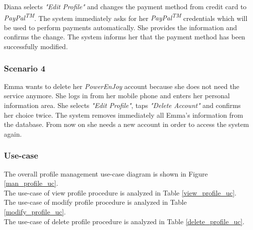 Diana selects \emph{"Edit Profile"} and changes the payment method from credit card to \emph{PayPal\textsuperscript{TM}}. The system immediately asks for her \emph{PayPal\textsuperscript{TM}} credentials which will be used to perform payments automatically. She provides the information and confirms the change. The system informs her that the payment method has been successfully modified.

\subsubsection{Scenario 4}
Emma wants to delete her \emph{PowerEnJoy} account because she does not need the service anymore. She logs in from her mobile phone and enters her personal information area. She selects \emph{"Edit Profile"}, taps \emph{"Delete Account"} and confirms her choice twice. The system removes immediately all Emma's information from the database. From now on she needs a new account in order to access the system again.

\subsubsection{Use-case}
The overall profile management use-case diagram is shown in Figure \ref{man_profile_uc}. \\
The use-case of view profile procedure is analyzed in Table \ref{view_profile_uc}. \\
The use-case of modify profile procedure is analyzed in Table \ref{modify_profile_uc}. \\
The use-case of delete profile procedure is analyzed in Table \ref{delete_profile_uc}.


